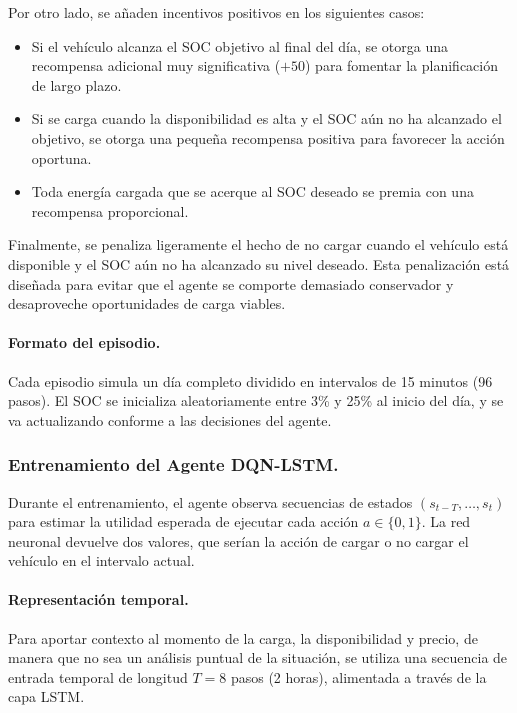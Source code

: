 Por otro lado, se añaden incentivos positivos en los siguientes casos:
\begin{itemize}
    \item Si el vehículo alcanza el SOC objetivo al final del día, se otorga una recompensa 
    adicional muy significativa (\(+50\)) para fomentar la planificación de largo plazo.
    \item Si se carga cuando la disponibilidad es alta y el SOC aún no ha alcanzado el objetivo, 
    se otorga una pequeña recompensa positiva para favorecer la acción oportuna.
    \item Toda energía cargada que se acerque al SOC deseado se premia con una recompensa 
    proporcional.
\end{itemize}

Finalmente, se penaliza ligeramente el hecho de no cargar cuando el vehículo está disponible y el 
SOC aún no ha alcanzado su nivel deseado. Esta penalización está diseñada para evitar que el 
agente se comporte demasiado conservador y desaproveche oportunidades de carga viables.\\

\paragraph{Formato del episodio.}  
Cada episodio simula un día completo dividido en intervalos de 15 minutos (96 pasos). El SOC se 
inicializa aleatoriamente entre 3\% y 25\% al inicio del día, y se va actualizando conforme a las 
decisiones del agente.

\subsubsection{Entrenamiento del Agente DQN-LSTM.}  
Durante el entrenamiento, el agente observa secuencias de estados \((s_{t-T}, \ldots, s_t)\) para 
estimar la utilidad esperada de ejecutar cada acción \(a \in \{0, 1\}\). La red neuronal devuelve 
dos valores, que serían la acción de cargar o no cargar el vehículo en el intervalo actual.

\paragraph{Representación temporal.}  
Para aportar contexto al momento de la carga, la disponibilidad y precio, de manera que no sea un 
análisis puntual de la situación, se utiliza una secuencia de entrada temporal de longitud 
\(T = 8\) pasos (2 horas), alimentada a través de la capa LSTM.

